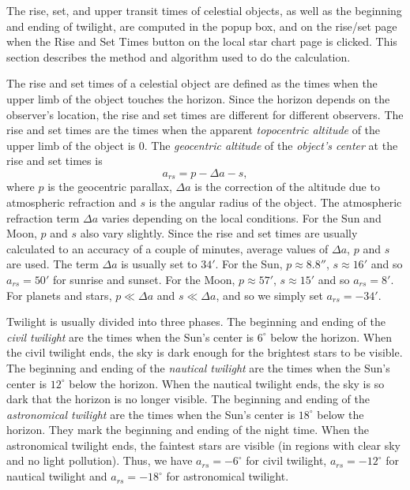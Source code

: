 \documentclass[12pt]{article}
\newcommand \beq {\begin{equation}}
\newcommand \eeq {\end{equation}}
\begin{document}
The rise, set, and upper transit times of celestial objects, as well as the beginning and 
ending of twilight, are computed in the popup box, and on the rise/set page when  
the Rise and Set Times button on the local star chart page is clicked. This section describes 
the method and algorithm used to do the calculation.

The rise and set times of a celestial object are defined as the times 
when the upper limb of the object touches the horizon.
Since the horizon depends on the observer's 
location, the rise and set times are different for different observers. 
The rise and set times are the times when the apparent {\em topocentric 
altitude} of the upper limb of the object is 0. 
The {\em geocentric altitude} of the {\em object's center} at the rise and set 
times is 
\beq
  a_{rs} = p - \Delta a - s , 
\eeq
where $p$ is the geocentric parallax, $\Delta a$ is the correction of the 
altitude due to atmospheric refraction and $s$ is the angular radius of the 
object. The atmospheric refraction term $\Delta a$ varies depending on the 
local conditions. For the Sun and Moon, $p$ and $s$ also vary slightly. Since 
the rise and set times are usually calculated to an accuracy of a couple of minutes, 
average values of $\Delta a$, $p$ and $s$ are used. The term $\Delta a$ is usually set 
to $34'$. For the Sun, $p \approx 8.8''$, $s\approx 16'$ and so $a_{rs}=50'$ for 
sunrise and sunset. For the Moon, $p\approx 57'$, $s\approx 15'$ and so $a_{rs}=8'$. 
For planets and stars, $p \ll \Delta a$ and $s \ll \Delta a$, and so we simply 
set $a_{rs}=-34'$. 

Twilight is usually divided into three phases. The beginning and ending 
of the {\em civil twilight} are the times when the Sun's center is $6^\circ$ below 
the horizon. When the civil twilight ends, the sky is dark enough for the 
brightest stars to be visible. The beginning and ending of the {\em nautical 
twilight} are the times when the Sun's center is $12^\circ$ below the horizon. When the 
nautical twilight ends, the sky is so dark that the horizon is no longer visible. 
The beginning and ending of the {\em astronomical twilight} are the times when 
the Sun's center is $18^\circ$ below the horizon. They mark the beginning and ending 
of the night time. When the astronomical twilight ends, the faintest stars 
are visible (in regions with clear sky and no light pollution). Thus, we have $a_{rs}=-6^\circ$ 
for civil twilight, $a_{rs}=-12^\circ$ for nautical twilight and 
$a_{rs}=-18^\circ$ for astronomical twilight.
\end{document}
